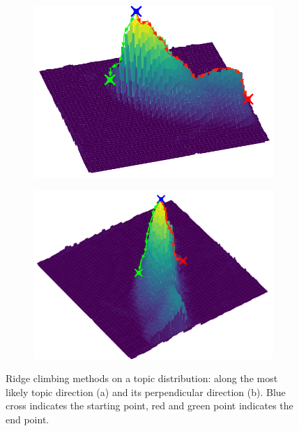 \begin{figure}
\centering
    \begin{subfigure}{0.48\linewidth}
        \includegraphics[width=\linewidth]{./img/scene_learning/ridge_climbing.pdf}
        \subcaption{}
        \label{subfig:scene-ridge-climbing}
    \end{subfigure}
    \begin{subfigure}{0.48\linewidth}
        \includegraphics[width=\linewidth]{./img/scene_learning/ridge_climbing_perp.pdf}
        \subcaption{}
        \label{subfig:scene-ridge-climbing-perp}
    \end{subfigure}%
    \caption{Ridge climbing methods on a topic distribution: along the most likely topic direction (a) and its perpendicular direction (b). Blue cross indicates the starting point, red and green point indicates the end point.}
    \label{fig:scene-ridge-clibming}
\end{figure}
